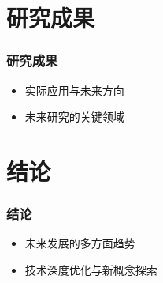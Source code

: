 \documentclass{beamer}
\begin{document}
\section{研究成果}
\begin{frame}
  \frametitle{研究成果}
  \begin{itemize}
    \item 实际应用与未来方向
    \item 未来研究的关键领域
  \end{itemize}
\end{frame}

\section{结论}
\begin{frame}
  \frametitle{结论}
  \begin{itemize}
    \item 未来发展的多方面趋势
    \item 技术深度优化与新概念探索
  \end{itemize}
\end{frame}
\end{document}

